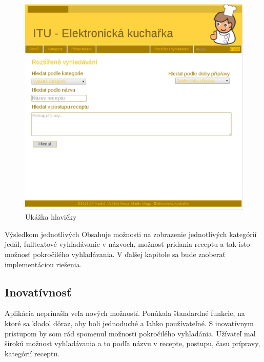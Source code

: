 \documentclass[12pt,a4paper,titlepage,final]{article}
\begin{document}
\begin{figure}
\begin{center}

\includegraphics[scale=0.7]{img/extendedsearch.eps} 
\caption{Ukážka hlavičky}
\label{koncept}

\end{center}

\end{figure}


Výsledkom jednotlivých Obsahuje možnosti na zobrazenie jednotlivých kategórií jedál, fulltextové vyhľadávanie v názvoch, možnosť pridania receptu  a tak isto možnosť pokročilého vyhľadávania. V ďalšej kapitole sa bude zaoberať implementáciou riešenia. 

\subsection{Inovatívnosť}
Aplikácia neprínašla veľa nových možností. Ponúkala štandardné funkcie, na ktoré sa kladol dôraz, aby boli jednoduché a ľahko používateľné. S inovatívnym prístupom by som rád spomenul možnosti pokročilého vyhľadánia. Užívateľ mal širokú možnosť vyhľadávania a to podľa názvu v recepte, postupu, času prípravy, kategórií receptu.
\end{document}
